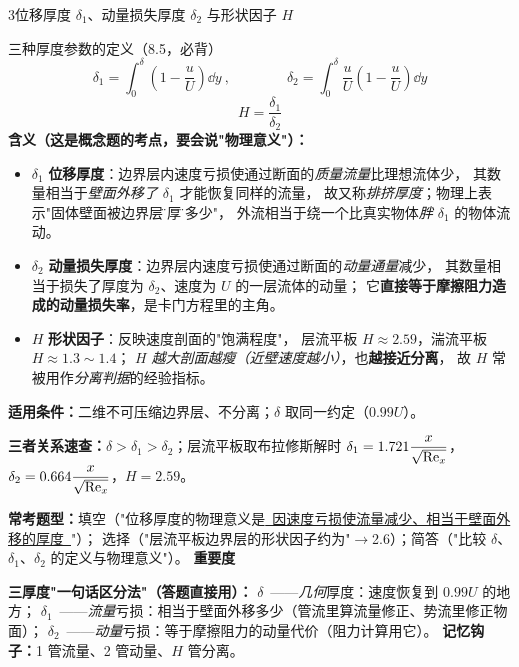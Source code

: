 \begin{kaodian}{3}{位移厚度 $\delta_1$、动量损失厚度 $\delta_2$ 与形状因子 $H$}
\begin{gongshi}{三种厚度参数的定义（8.5，必背）}
\[ \delta_1=\int_0^{\delta}\left(1-\frac{u}{U}\right)\dd y\ ,\qquad\qquad
   \delta_2=\int_0^{\delta}\frac{u}{U}\left(1-\frac{u}{U}\right)\dd y \]
\[ H=\frac{\delta_1}{\delta_2} \]
\textbf{含义（这是概念题的考点，要会说"物理意义"）：}
\begin{itemize}
  \item $\delta_1$ \textbf{位移厚度}：边界层内速度亏损使通过断面的\emph{质量流量}比理想流体少，
        其数量相当于\emph{壁面外移了 $\delta_1$} 才能恢复同样的流量，
        故又称\emph{排挤厚度}；物理上表示"固体壁面被边界层\"增厚\"了多少"，
        外流相当于绕一个比真实物体\emph{胖 $\delta_1$} 的物体流动。
  \item $\delta_2$ \textbf{动量损失厚度}：边界层内速度亏损使通过断面的\emph{动量通量}减少，
        其数量相当于损失了厚度为 $\delta_2$、速度为 $U$ 的一层流体的动量；
        它\textbf{直接等于摩擦阻力造成的动量损失率}，是卡门方程里的主角。
  \item $H$ \textbf{形状因子}：反映速度剖面的"饱满程度"，
        层流平板 $H\approx2.59$，湍流平板 $H\approx1.3\sim1.4$；
        $H$ \emph{越大剖面越瘦（近壁速度越小）}，也\textbf{越接近分离}，
        故 $H$ 常被用作\emph{分离判据}的经验指标。
\end{itemize}
\textbf{适用条件：}二维不可压缩边界层、不分离；$\delta$ 取同一约定（$0.99U$）。
\end{gongshi}

\textbf{三者关系速查：}$\delta>\delta_1>\delta_2$；层流平板取布拉修斯解时
$\delta_1=1.721\dfrac{x}{\sqrt{\mathrm{Re}_x}}$，$\delta_2=0.664\dfrac{x}{\sqrt{\mathrm{Re}_x}}$，$H=2.59$。

\textbf{常考题型：}填空（"位移厚度的物理意义是\underline{\ 因速度亏损使流量减少、相当于壁面外移的厚度\ }"）；
选择（"层流平板边界层的形状因子约为"$\to$2.6）；简答（"比较 $\delta$、$\delta_1$、$\delta_2$ 的定义与物理意义"）。
\textbf{重要度 }\quad{}\quad{}

\begin{banfa}
\textbf{三厚度"一句话区分法"（答题直接用）：}
$\delta$\ ——\emph{几何}厚度：速度恢复到 $0.99U$ 的地方；
$\delta_1$\ ——\emph{流量}亏损：相当于壁面外移多少（管流里算流量修正、势流里修正物面）；
$\delta_2$\ ——\emph{动量}亏损：等于摩擦阻力的动量代价（阻力计算用它）。
\textbf{记忆钩子：}1 管流量、2 管动量、$H$ 管分离。
\end{banfa}
\end{kaodian}

